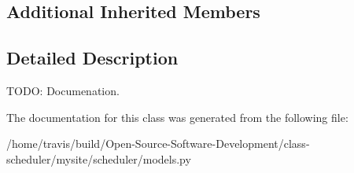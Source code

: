 \subsection*{Additional Inherited Members}


\subsection{Detailed Description}
T\-O\-D\-O\-: Documenation. 

The documentation for this class was generated from the following file\-:\begin{DoxyCompactItemize}
\item 
/home/travis/build/\-Open-\/\-Source-\/\-Software-\/\-Development/class-\/scheduler/mysite/scheduler/models.\-py\end{DoxyCompactItemize}
